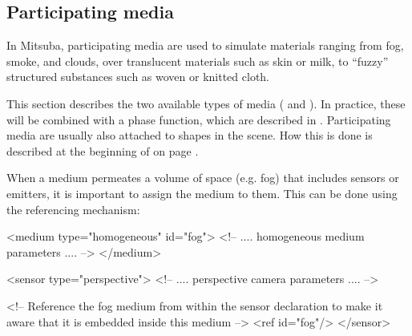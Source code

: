 \newpage
\subsection{Participating media}
\label{sec:media}
\vspace{-1cm}
In Mitsuba, participating media are used to simulate materials ranging from
fog, smoke, and clouds, over translucent materials such as skin or milk,
to ``fuzzy'' structured substances such as woven or knitted cloth.

This section describes the two available types of media
( and ). In practice, these
will be combined with a phase function, which are described in .
Participating media are usually also attached to shapes in the scene.
How this is done is described at the beginning of  on page
\pageref{sec:shapes}.

When a medium permeates a volume of space (e.g. fog) that includes sensors or emitters,
it is important to assign the medium to them. This can be done using the
referencing mechanism:

\begin{xml}
<medium type="homogeneous" id="fog">
    <!-- .... homogeneous medium parameters .... -->
</medium>

<sensor type="perspective">
    <!-- .... perspective camera parameters .... -->

    <!-- Reference the fog medium from within the sensor declaration
         to make it aware that it is embedded inside this medium -->
    <ref id="fog"/>
</sensor>
\end{xml}
